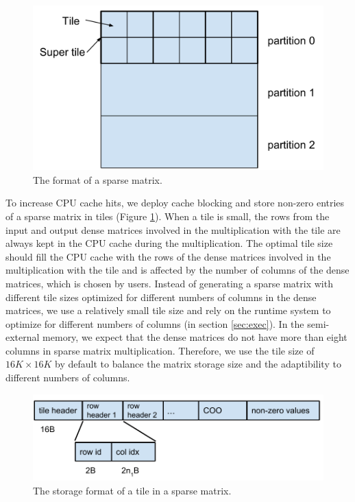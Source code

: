 \begin{figure}
\centering
\includegraphics[scale=0.3]{./sparse_mat.pdf}
\caption{The format of a sparse matrix.}
\label{sparse_mat}
\end{figure}

To increase CPU cache hits, we deploy cache blocking \cite{Im04} and store
non-zero entries of a sparse matrix in tiles (Figure \ref{sparse_mat}).
When a tile is small, the rows from the input and output dense matrices
involved in the multiplication with the tile are always kept in the CPU cache
during the multiplication. The optimal tile size should fill the CPU cache
with the rows of the dense matrices involved in the multiplication with
the tile and is affected by the number of columns of the dense matrices,
which is chosen by users. Instead of generating a sparse matrix with
different tile sizes optimized for different numbers of columns in the dense
matrices, we use a relatively small tile size and rely on the runtime system
to optimize for different numbers of columns (in section \ref{sec:exec}).
In the semi-external memory, we expect that the dense matrices do not
have more than eight columns in sparse matrix multiplication. Therefore, we
use the tile size of $16K \times 16K$ by default to balance the matrix storage
size and the adaptibility to different numbers of columns.

\begin{figure}
\centering
\includegraphics[scale=0.5]{./tile_format.pdf}
\caption{The storage format of a tile in a sparse matrix.}
\label{tile_format}
\end{figure}

